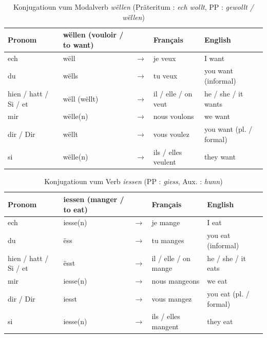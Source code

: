 \begin{table}[htbp]
    \centering
    \begin{tabular}{ll c l l}
        \toprule
        \textbf{Pronom} & \textbf{wëllen (vouloir / to want)} & \textbf{} & \textbf{Français} & \textbf{English} \\
        \midrule
        ech & wëll & $\rightarrow$ & je veux & I want \\
        du & wëlls & $\rightarrow$ & tu veux & you want (informal) \\
        hien / hatt / Si / et & wëll (wëllt) & $\rightarrow$ & il / elle / on veut & he / she / it wants \\
        \midrule
        mir & wëlle(n) & $\rightarrow$ & nous voulons & we want \\
        dir / Dir & wëllt & $\rightarrow$ & vous voulez & you want (pl. / formal) \\
        si & wëlle(n) & $\rightarrow$ & ils / elles veulent & they want \\
        \bottomrule
    \end{tabular}
    \caption{Konjugatioun vum Modalverb \textit{wëllen} (Präteritum : \textit{ech wollt}, PP : \textit{gewollt / wëllen})}
\end{table}

\begin{table}[htbp]
    \centering
    \begin{tabular}{ll c l l}
        \toprule
        \textbf{Pronom} & \textbf{iessen (manger / to eat)} & \textbf{} & \textbf{Français} & \textbf{English} \\
        \midrule
        ech & iesse(n) & $\rightarrow$ & je mange & I eat \\
        du & ëss & $\rightarrow$ & tu manges & you eat (informal) \\
        hien / hatt / Si / et & ësst & $\rightarrow$ & il / elle / on mange & he / she / it eats \\
        \midrule
        mir & iesse(n) & $\rightarrow$ & nous mangeons & we eat \\
        dir / Dir & iesst & $\rightarrow$ & vous mangez & you eat (pl. / formal) \\
        si & iesse(n) & $\rightarrow$ & ils / elles mangent & they eat \\
        \bottomrule
    \end{tabular}
    \caption{Konjugatioun vum Verb \textit{iessen} (PP : \textit{giess}, Aux. : \textit{hunn})}
\end{table}

